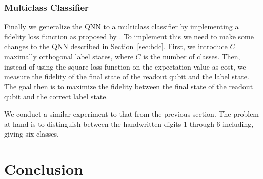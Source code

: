 \documentclass[a4paper,10pt]{article}
\begin{document}
\subsubsection{Multiclass Classifier}
Finally we generalize the QNN to a multiclass classifier by implementing a fidelity loss function as proposed by \cite{perez2019data}.
To implement this we need to make some changes to the QNN described in Section~\ref{sec:bdc}.
First, we introduce $C$ maximally orthogonal label states, where $C$ is the number of classes.
Then, instead of using the square loss function on the expectation value as cost, we measure the fidelity of the final state of the readout qubit and the label state.
The goal then is to maximize the fidelity between the final state of the readout qubit and the correct label state.

We conduct a similar experiment to that from the previous section.
The problem at hand is to distinguish between the handwritten digits 1 through 6 including, giving six classes.

\section{Conclusion} \label{sec:conclusion}

\clearpage

\printbibliography[heading=bibintoc]
\end{document}
